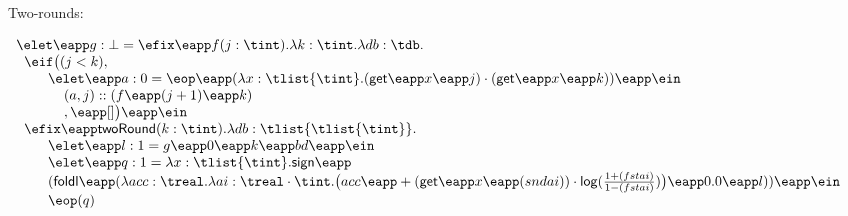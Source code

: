 \newpage
\begin{figure}
\small
Two-rounds:

\[
\begin{array}{l}
  \elet \eapp  g: \bot = 
  \efix \eapp f(j: \tint). \lambda k: \tint. \lambda db: \tdb.\\
  \hspace{.2cm}  \eif \big (  (j < k)  ,  \\
  \hspace{.8cm}  \elet \eapp  a: 0 = 
                 \eop \eapp  
                 (\lambda x: \tlist {\tint}. 
                 (\mathsf{get} \eapp x \eapp j) \cdot (\mathsf{get} \eapp x \eapp k) ) 
                  \eapp \ein \\
  \hspace{1.2cm} (a, j) :: (f  \eapp (j+1) \eapp  k) \\
  \hspace{1.2cm} ,\eapp  [] \big) \eapp \ein\\
  \hspace{.2cm}  \efix \eapp \mathsf{twoRound}(k : \tint). 
                 \lambda db:\tlist {\tlist {\tint}}.\\
  \hspace{.8cm}  \elet \eapp  l: 1 = g \eapp  0 \eapp  k \eapp bd \eapp  \ein \\
  \hspace{.8cm}  \elet \eapp  q: 1 =  \lambda x: \tlist {\tint}. \mathsf{sign} \eapp \\ 
  \hspace{.8cm}  (\mathsf{foldl} \eapp  (\lambda acc: \treal. 
                 \lambda ai: \treal \cdot \tint. 
                 \big(acc\eapp + (\mathsf{get} \eapp x \eapp  (snd ai)) 
                 \cdot \mathsf{log}(\frac{1+ (fst ai) }{1- (fst ai)}) \big)
                 \eapp  0.0 \eapp  l )) \eapp  \ein \\
  \hspace{.8cm}  \eop ( q )
\end{array}
\]
\end{figure}


